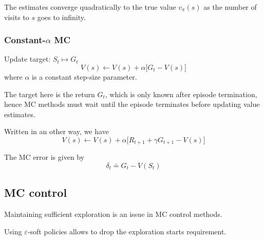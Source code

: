The estimates converge quadratically to the true value \( v_\pi(s) \) as the number of visits to \( s \) goes to infinity.

\subsubsection{Constant-\texorpdfstring{\( \alpha \)}{alpha} MC}

Update target: \( S_t \mapsto G_t \)
\begin{equation}
    V(s) \leftarrow V(s) + \alpha \Big[ G_t - V(s) \Big]
\end{equation}
where \( \alpha \) is a constant step-size parameter.

The target here is the return \( G_t \), which is only known after episode termination, hence MC methods must wait until the episode terminates before updating value estimates.

Written in an other way, we have
\begin{equation}\label{eq:mc-update-rule-2}
    V(s) \leftarrow V(s) + \alpha \Big[ R_{t+1} + \gamma G_{t+1} - V(s) \Big]
\end{equation}

The MC error is given by
\begin{equation}\label{eq:mc-error}
    \delta_t \doteq G_t - V(S_t)
\end{equation}

\subsection{MC control}

Maintaining sufficient exploration is an issue in MC control methods.

Using \( \varepsilon \)-soft policies allows to drop the exploration starts requirement.
